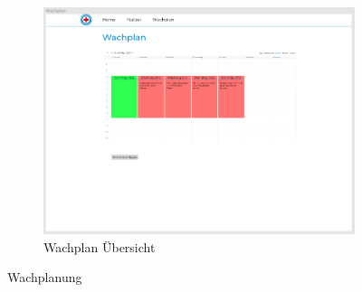 \documentclass[fontsize=12pt,openright,oneside,paper=a4,BCOR=1cm]{scrbook}
\begin{document}
\begin{figure}[H]
\begin{subfigure}[b]{0.7\linewidth}
    \includegraphics[width=\linewidth]{Anlagen/Figma/13-WachplanuebersichtAngelegt.png}
    \caption{Wachplan Übersicht}
  \end{subfigure}
  \caption{Wachplanung}
  \label{fig:wachplan}
\end{figure}

\end{document}
